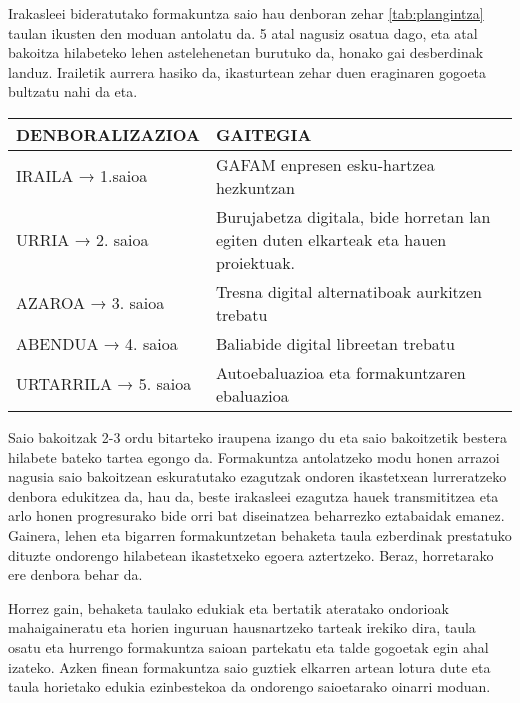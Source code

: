 Irakasleei bideratutako formakuntza saio hau denboran zehar \ref{tab:plangintza} taulan ikusten den moduan antolatu da. 5 atal nagusiz osatua dago, eta atal bakoitza hilabeteko lehen astelehenetan burutuko da, honako gai desberdinak landuz. Irailetik aurrera hasiko da, ikasturtean zehar duen eraginaren gogoeta bultzatu nahi da eta.

\begin{center}
    \label{tab:plangintza}
    \begin{tabular}{|p{}|p{9cm}|}
        \hline
        \rowcolor[HTML]{D9D9D9} 
        \textbf{DENBORALIZAZIOA} & \textbf{GAITEGIA}
        \\ \hline
        IRAILA → 1.saioa & GAFAM enpresen esku-hartzea hezkuntzan
        \\ \hline
        URRIA → 2. saioa & Burujabetza digitala, bide horretan lan egiten duten elkarteak eta hauen   proiektuak.
        \\ \hline
        AZAROA → 3. saioa & Tresna digital alternatiboak aurkitzen trebatu
        \\ \hline
        ABENDUA → 4. saioa & Baliabide digital libreetan trebatu
        \\ \hline
        URTARRILA → 5. saioa & Autoebaluazioa eta formakuntzaren ebaluazioa
        \\ \hline
    \end{tabular}
\end{center}

Saio bakoitzak 2-3 ordu bitarteko iraupena izango du eta saio bakoitzetik bestera hilabete bateko tartea egongo da. Formakuntza antolatzeko modu honen arrazoi nagusia saio bakoitzean eskuratutako ezagutzak ondoren ikastetxean lurreratzeko denbora edukitzea da, hau da, beste irakasleei ezagutza hauek transmititzea eta arlo honen progresurako bide orri bat diseinatzea beharrezko eztabaidak emanez. Gainera, lehen eta bigarren formakuntzetan behaketa taula ezberdinak prestatuko dituzte ondorengo hilabetean ikastetxeko egoera aztertzeko. Beraz, horretarako ere denbora behar da.

Horrez gain, behaketa taulako edukiak eta bertatik ateratako ondorioak mahaigaineratu eta horien inguruan hausnartzeko tarteak irekiko dira, taula osatu eta hurrengo formakuntza saioan partekatu eta talde gogoetak egin ahal izateko. Azken finean formakuntza saio guztiek elkarren artean lotura dute eta taula horietako edukia ezinbestekoa da ondorengo saioetarako oinarri moduan.


